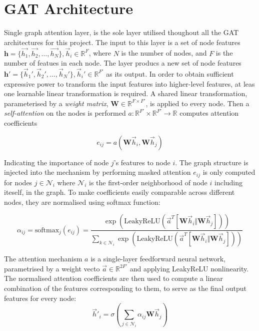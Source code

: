 \documentclass{article}
\begin{document}
\section{GAT Architecture}
Single graph attention layer, is the sole layer utilised thoughout all the GAT
architectures for this project.
The input to this layer is a set of node features $\mathbf{h} = \{ \vec{h_1},
\vec{h_2},\ldots ,\vec{h_N}\}, \vec{h}_i \in \mathbb{R}^F$, where $N$ is the
number of nodes, and $F$ is the number of featues in each node. The layer
producs a new set of node features $\mathbf{h'} = \{ \vec{h}_1',
\vec{h}_2',\ldots ,\vec{h}_N'\}, \vec{h}_i' \in \mathbb{R}^{F'}$ as its output.
In order to obtain sufficient expressive power to transform the input features
into higher-level features, at leas one learnable linear transformation is
required. A shared linear transformation, parameterised by a \textit{weight
matrix}, $\mathbf{W} \in \mathbb{R}^{F \times F'}$, is applied to every node.
Then a \textit{self-attention} on the nodes is performed $a : \mathbb{R}^{F'}
\times \mathbb{R}^{F'} \to \mathbb{R}$ computes attention coefficients

\begin{equation}
  e_{ij} = a\left( \mathbf{W}\vec{h}_i , \mathbf{W}\vec{h}_j\right)
  \label{eq:1}
\end{equation}

Indicating the importance of node $j$'s features to node $i$. The graph
structure is injected into the mechanism by performing masked attention
$e_{ij}$ is only computed for nodes $j \in \mathcal{N}_i$ where $\mathcal{N}_i$
is the first-order neighborhood of node $i$ including iteself, in the graph. To
make coefficients easily comparable across different nodes, they are normalised
using softmax function:

\begin{equation}
  \alpha_{ij} = \text{softmax}_j(e_{ij}) =
  \frac{
    \exp\left(\text{LeakyReLU}\left( \vec{a}^T [\mathbf{W}\vec{h}_i
    \Vert\mathbf{W}\vec{h}_j] \right) \right)
  } 
  {
    \sum_{k \in \mathcal{N}_i} \exp\left(\text{LeakyReLU}\left( \vec{a}^T
    [\mathbf{W}\vec{h}_i \Vert\mathbf{W}\vec{h}_j] \right) \right)
  }
  \label{eq:2}
\end{equation}

The attention mechanism $a$ is a single-layer feedforward neural network,
parametrised by a weight vecto $\vec{a} \in \mathbb{R}^{2F'}$ and applying
LeakyReLU nonlinearity.
The normalised attention coefficients are then used to compute a linear combination of the features
corresponding to them, to serve as the final output features for every node:
\begin{equation}
  \vec{h}'_i = \sigma\left( \sum_{j \in \mathcal{N}_i} \alpha_{ij} \mathbf{W}\vec{h}_j \right)
  \label{eq:3}
\end{equation}
\end{document}
